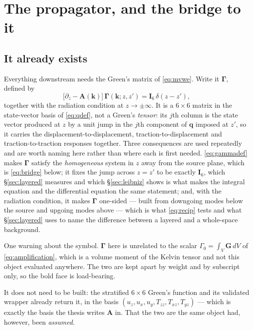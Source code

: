 \documentclass[11pt,a4paper]{article}
\newcommand{\bA}{\mathbf{A}}
\newcommand{\bq}{\mathbf{q}}
\newcommand{\bG}{\mathbf{G}}
\newcommand{\Isix}{\mathbf{I}_{6}}
\begin{document}
\section{The propagator, and the bridge to it}\label{sec:bridge}

\subsection{It already exists}

Everything downstream needs the Green's matrix of \eqref{eq:mvwe}.  Write it
$\boldsymbol\Gamma$, defined by
\begin{equation}\label{eq:gammadef}
  \bigl[\partial_z - \bA(\mathbf{k})\bigr]\,
  \boldsymbol\Gamma(\mathbf{k}; z,z') = \Isix\,\delta(z-z'),
\end{equation}
together with the radiation condition at $z\to\pm\infty$.  It is a $6\times6$
matrix in the state-vector basis of \eqref{eq:qdef}, not a Green's
\emph{tensor}: its $j$th column is the state vector produced at $z$ by a unit
jump in the $j$th component of $\bq$ imposed at $z'$, so it carries the
displacement-to-displacement, traction-to-displacement and
traction-to-traction responses together.  Three consequences are used
repeatedly and are worth naming here rather than where each is first needed.
\eqref{eq:gammadef} makes $\boldsymbol\Gamma$ satisfy the \emph{homogeneous}
system in $z$ away from the source plane, which is \eqref{eq:bridge} below; it
fixes the jump across $z=z'$ to be exactly $\Isix$, which
\S\ref{sec:layered} measures and which \S\ref{sec:leibniz} shows is what makes
the integral equation and the differential equation the same statement; and,
with the radiation condition, it makes $\boldsymbol\Gamma$ one-sided --- built
from downgoing modes below the source and upgoing modes above --- which is what
\eqref{eq:recip} tests and what \S\ref{sec:layered} uses to name the difference
between a layered and a whole-space background.

One warning about the symbol.  $\boldsymbol\Gamma$ here is unrelated to the
scalar $\Gamma_0 = \int_V \bG\,dV$ of \eqref{eq:amplification}, which is a
volume moment of the Kelvin tensor and not this object evaluated anywhere.  The
two are kept apart by weight and by subscript only, so the bold face is
load-bearing.

It does not need to be built: the stratified $6\times6$ Green's function and its
validated wrapper already return it, in the basis
$(u_z,u_x,u_y,T_{zz},T_{xz},T_{yz})$ --- which is exactly the basis the thesis
writes $\bA$ in.  That the two are the same object had, however, been
\emph{assumed}.
\end{document}
